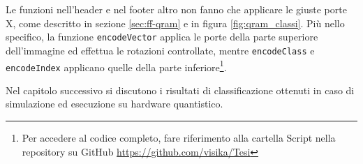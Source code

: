 Le funzioni nell'header e nel footer altro non fanno che applicare le giuste porte X, 
come descritto in sezione \ref{sec:ff-qram} e in figura \ref{fig:qram_classi}. 
Più nello specifico, la funzione \texttt{encodeVector} applica le porte della parte 
superiore dell'immagine ed effettua le rotazioni controllate, 
mentre \texttt{encodeClass} e \texttt{encodeIndex} applicano 
quelle della parte inferiore\footnote{Per accedere al codice completo, fare riferimento 
alla cartella Script nella repository su GitHub \url{https://github.com/visika/Tesi}}. 

Nel capitolo successivo si discutono i risultati di classificazione ottenuti in 
caso di simulazione ed esecuzione su hardware quantistico. 



